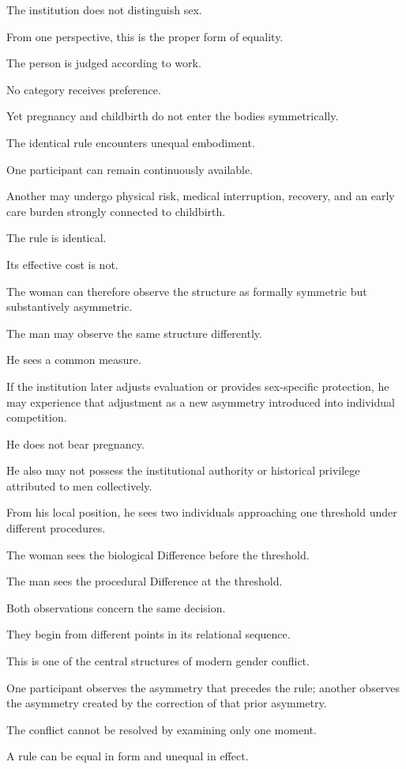 The institution does not distinguish sex.

From one perspective, this is the proper form of equality.

The person is judged according to work.

No category receives preference.

Yet pregnancy and childbirth do not enter the bodies symmetrically.

The identical rule encounters unequal embodiment.

One participant can remain continuously available.

Another may undergo physical risk, medical interruption, recovery, and an early care burden strongly connected to childbirth.

The rule is identical.

Its effective cost is not.

The woman can therefore observe the structure as formally symmetric but substantively asymmetric.

The man may observe the same structure differently.

He sees a common measure.

If the institution later adjusts evaluation or provides sex-specific protection, he may experience that adjustment as a new asymmetry introduced into individual competition.

He does not bear pregnancy.

He also may not possess the institutional authority or historical privilege attributed to men collectively.

From his local position, he sees two individuals approaching one threshold under different procedures.

The woman sees the biological Difference before the threshold.

The man sees the procedural Difference at the threshold.

Both observations concern the same decision.

They begin from different points in its relational sequence.

This is one of the central structures of modern gender conflict.

One participant observes the asymmetry that precedes the rule; another observes the asymmetry created by the correction of that prior asymmetry.

The conflict cannot be resolved by examining only one moment.

A rule can be equal in form and unequal in effect.

